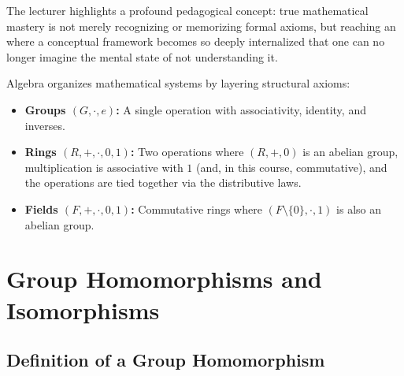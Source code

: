 \begin{insight}
The lecturer highlights a profound pedagogical concept: true mathematical mastery is not merely recognizing or memorizing formal axioms, but reaching an  where a conceptual framework becomes so deeply internalized that one can no longer imagine the mental state of not understanding it.
\end{insight}

\begin{insight}
Algebra organizes mathematical systems by layering structural axioms:
\begin{itemize}
    \item \textbf{Groups $(G, \cdot, e)$:} A single operation with associativity, identity, and inverses.
    \item \textbf{Rings $(R, +, \cdot, 0, 1)$:} Two operations where $(R, +, 0)$ is an abelian group, multiplication is associative with $1$ (and, in this course, commutative), and the operations are tied together via the distributive laws.
    \item \textbf{Fields $(F, +, \cdot, 0, 1)$:} Commutative rings where $(F \setminus \{0\}, \cdot, 1)$ is also an abelian group.
\end{itemize}
\end{insight}

\begin{hidden}
\end{hidden}

\section{Group Homomorphisms and Isomorphisms}

\subsection{Definition of a Group Homomorphism}

